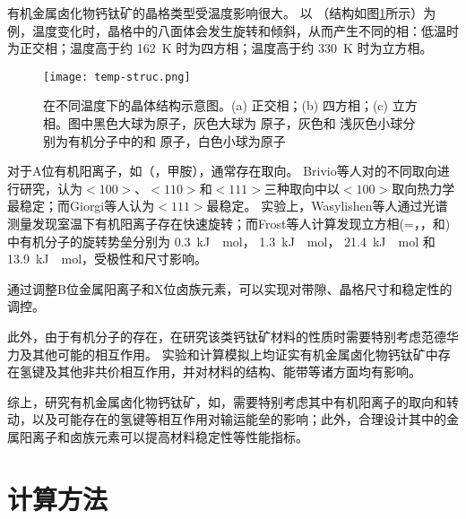 有机金属卤化物钙钛矿的晶格类型受温度影响很大。
以 （结构如图\ref{fig:temp-struc}所示）为例，温度变化时，晶格中的八面体会发生旋转和倾斜，从而产生不同的相：低温时为正交相；温度高于约 \SI{162}{K} 时为四方相；温度高于约 \SI{330}{K} 时为立方相。

\begin{figure}[htbp]
    \centering
    \texttt{[image: temp-struc.png]}
    \caption{在不同温度下的晶体结构示意图。(a) 正交相；(b) 四方相；(c) 立方相。图中黑色大球为原子，灰色大球为  原子，灰色和 浅灰色小球分别为有机分子中的和 原子，白色小球为原子}
    \label{fig:temp-struc}
\end{figure}

对于A位有机阳离子，如（，甲胺），通常存在取向。
Brivio等人对的不同取向进行研究，认为$<100>$、$<110>$和$<111>$三种取向中以$<100>$取向热力学最稳定；而Giorgi等人认为$<111>$最稳定。
实验上，Wasylishen等人通过光谱测量发现室温下有机阳离子存在快速旋转；而Frost等人计算发现立方相(=，，和)中有机分子的旋转势垒分别为 \SI{0.3}{kJ \per \mole}， \SI{1.3}{kJ \per \mole}，  \SI{21.4}{kJ \per\mole} 和 \SI{13.9}{kJ \per \mole}，受极性和尺寸影响。

通过调整B位金属阳离子和X位卤族元素，可以实现对带隙、晶格尺寸和稳定性的调控。

此外，由于有机分子的存在，在研究该类钙钛矿材料的性质时需要特别考虑范德华力及其他可能的相互作用。
实验和计算模拟上均证实有机金属卤化物钙钛矿中存在氢键及其他非共价相互作用，并对材料的结构、能带等诸方面均有影响。

综上，研究有机金属卤化物钙钛矿，如，需要特别考虑其中有机阳离子的取向和转动，以及可能存在的氢键等相互作用对输运能垒的影响；此外，合理设计其中的金属阳离子和卤族元素可以提高材料稳定性等性能指标。

\section{计算方法}


